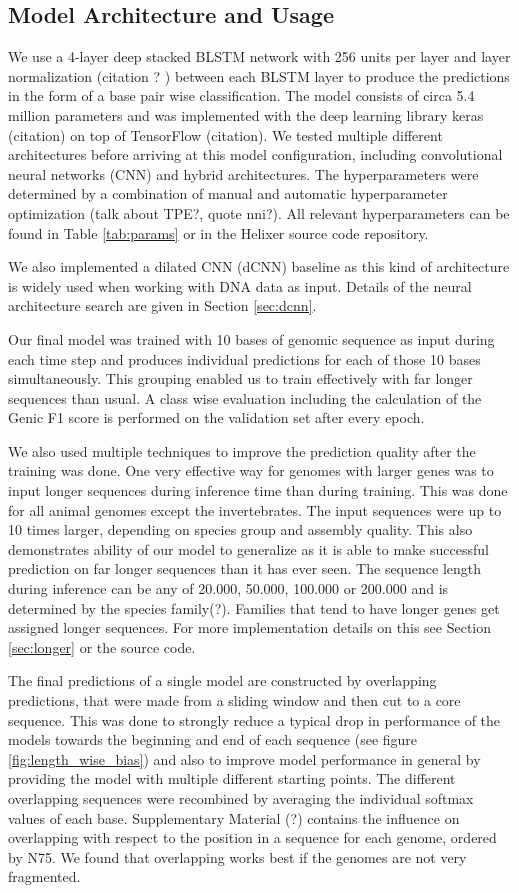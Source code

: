 \documentclass{bioinfo}
\begin{document}
\begin{methods}
\subsection{Model Architecture and Usage}
\label{sec:model}
We use a 4-layer deep stacked BLSTM network with 256 units per layer and layer normalization (citation ? ) between each BLSTM layer to produce the predictions in the form of a base pair wise classification. The model consists of circa 5.4 million parameters and was implemented with the deep learning library keras (citation) on top of TensorFlow (citation). We tested multiple different architectures before arriving at this model configuration, including convolutional neural networks (CNN) and hybrid architectures. The hyperparameters were determined by a combination of manual and automatic hyperparameter optimization (talk about TPE?, quote nni?). All relevant hyperparameters can be found in Table \ref{tab:params} or in the Helixer source code repository. 

We also implemented a dilated CNN (dCNN) baseline as this kind of architecture is widely used when working with DNA data as input. Details of the neural architecture search are given in Section \ref{sec:dcnn}.
	
Our final model was trained with 10 bases of genomic sequence as input during each time step and produces individual predictions for each of those 10 bases simultaneously. This grouping enabled us to train effectively with far longer sequences than usual. A class wise evaluation including the calculation of the Genic F1 score is performed on the validation set after every epoch.

We also used multiple techniques to improve the prediction quality after the training was done. One very effective way for genomes with larger genes was to input longer sequences during inference time than during training. This was done for all animal genomes except the invertebrates. The input sequences were up to 10 times larger, depending on species group and assembly quality. This also demonstrates ability of our model to generalize as it is able to make successful prediction on far longer sequences than it has ever seen. The sequence length during inference can be any of 20.000, 50.000, 100.000 or 200.000 and is determined by the species family(?). Families that tend to have longer genes get assigned longer sequences. For more implementation details on this see Section \ref{sec:longer} or the source code.
	
The final predictions of a single model are constructed by overlapping predictions, that were made from a sliding window and then cut to a core sequence. This was done to strongly reduce a typical drop in performance of the models towards the beginning and end of each sequence (see figure \ref{fig:length_wise_bias}) and also to improve model performance in general by providing the model with multiple different starting points. The different overlapping sequences were recombined by averaging the individual softmax values of each base. Supplementary Material (?) contains the influence on overlapping with respect to the position in a sequence for each genome, ordered by N75. We found that overlapping works best if the genomes are not very fragmented.


\end{methods}
\end{document}
